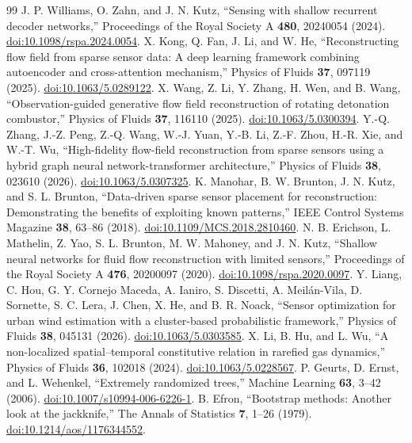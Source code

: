 \documentclass[aip,pof,preprint,notitlepage,floatfix,amsmath,amssymb]{revtex4-2}
\begin{document}
\begin{thebibliography}{99}
 J. P. Williams, O. Zahn, and J. N. Kutz, ``Sensing with shallow recurrent decoder networks,'' Proceedings of the Royal Society A \textbf{480}, 20240054 (2024). \href{https://doi.org/10.1098/rspa.2024.0054}{doi:10.1098/rspa.2024.0054}.
 X. Kong, Q. Fan, J. Li, and W. He, ``Reconstructing flow field from sparse sensor data: A deep learning framework combining autoencoder and cross-attention mechanism,'' Physics of Fluids \textbf{37}, 097119 (2025). \href{https://doi.org/10.1063/5.0289122}{doi:10.1063/5.0289122}.
 X. Wang, Z. Li, Y. Zhang, H. Wen, and B. Wang, ``Observation-guided generative flow field reconstruction of rotating detonation combustor,'' Physics of Fluids \textbf{37}, 116110 (2025). \href{https://doi.org/10.1063/5.0300394}{doi:10.1063/5.0300394}.
 Y.-Q. Zhang, J.-Z. Peng, Z.-Q. Wang, W.-J. Yuan, Y.-B. Li, Z.-F. Zhou, H.-R. Xie, and W.-T. Wu, ``High-fidelity flow-field reconstruction from sparse sensors using a hybrid graph neural network-transformer architecture,'' Physics of Fluids \textbf{38}, 023610 (2026). \href{https://doi.org/10.1063/5.0307325}{doi:10.1063/5.0307325}.
 K. Manohar, B. W. Brunton, J. N. Kutz, and S. L. Brunton, ``Data-driven sparse sensor placement for reconstruction: Demonstrating the benefits of exploiting known patterns,'' IEEE Control Systems Magazine \textbf{38}, 63--86 (2018). \href{https://doi.org/10.1109/MCS.2018.2810460}{doi:10.1109/MCS.2018.2810460}.
 N. B. Erichson, L. Mathelin, Z. Yao, S. L. Brunton, M. W. Mahoney, and J. N. Kutz, ``Shallow neural networks for fluid flow reconstruction with limited sensors,'' Proceedings of the Royal Society A \textbf{476}, 20200097 (2020). \href{https://doi.org/10.1098/rspa.2020.0097}{doi:10.1098/rspa.2020.0097}.
 Y. Liang, C. Hou, G. Y. Cornejo Maceda, A. Ianiro, S. Discetti, A. Meil\'an-Vila, D. Sornette, S. C. Lera, J. Chen, X. He, and B. R. Noack, ``Sensor optimization for urban wind estimation with a cluster-based probabilistic framework,'' Physics of Fluids \textbf{38}, 045131 (2026). \href{https://doi.org/10.1063/5.0303585}{doi:10.1063/5.0303585}.
 X. Li, B. Hu, and L. Wu, ``A non-localized spatial--temporal constitutive relation in rarefied gas dynamics,'' Physics of Fluids \textbf{36}, 102018 (2024). \href{https://doi.org/10.1063/5.0228567}{doi:10.1063/5.0228567}.
 P. Geurts, D. Ernst, and L. Wehenkel, ``Extremely randomized trees,'' Machine Learning \textbf{63}, 3--42 (2006). \href{https://doi.org/10.1007/s10994-006-6226-1}{doi:10.1007/s10994-006-6226-1}.
 B. Efron, ``Bootstrap methods: Another look at the jackknife,'' The Annals of Statistics \textbf{7}, 1--26 (1979). \href{https://doi.org/10.1214/aos/1176344552}{doi:10.1214/aos/1176344552}.

\end{thebibliography}
\end{document}
